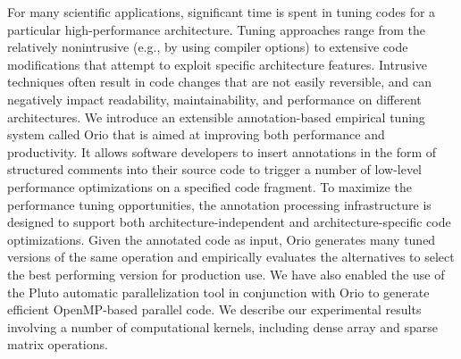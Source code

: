 For many scientific applications, significant time is spent in tuning
codes for a particular high-performance architecture. Tuning
approaches range from the relatively nonintrusive (e.g., by using
compiler options) to extensive code modifications that attempt to
exploit specific architecture features. Intrusive techniques often
result in code changes that are not easily reversible, and can
negatively impact readability, maintainability, and performance on
different architectures. We introduce an extensible annotation-based
empirical tuning system called Orio that is aimed at improving both
performance and productivity. It allows software developers to insert
annotations in the form of structured comments into their source code
to trigger a number of low-level performance optimizations on a
specified code fragment.  To maximize the performance tuning
opportunities, the annotation processing infrastructure is designed to
support both architecture-independent and architecture-specific code
optimizations. Given the annotated code as input, Orio generates many
tuned versions of the same operation and empirically evaluates the
alternatives to select the best performing version for production
use. We have also enabled the use of the Pluto automatic
parallelization tool in conjunction with Orio to generate efficient
OpenMP-based parallel code. We describe our experimental results
involving a number of computational kernels, including dense array and
sparse matrix operations.
